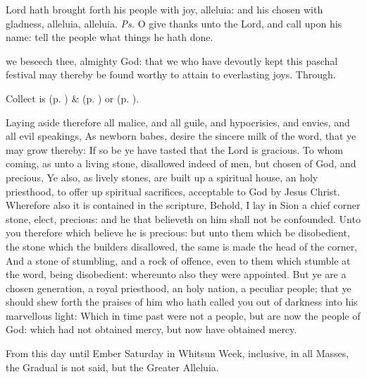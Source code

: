 
\introit
{} Lord hath brought forth his people with joy, alleluia: and his chosen with gladness, alleluia, alleluia. \textit{Ps.} O give thanks unto the Lord, and call upon his name: tell the people what things he hath done.

\collect
{} we beseech thee, almighty God: that we who have devoutly kept this paschal festival may thereby be found worthy to attain to everlasting joys. Through.
\begin{rubric}
     Collect is  (p. \pageref{EasterCollect}) \&   (p. \pageref{SPAgainst}) or  (p. \pageref{SPChiefBishop}).
\end{rubric}

 Laying aside therefore all malice, and all guile, and hypocrisies, and envies, and all evil speakings, As newborn babes, desire the sincere milk of the word, that ye may grow thereby: If so be ye have tasted that the Lord is gracious. To whom coming, as unto a living stone, disallowed indeed of men, but chosen of God, and precious, Ye also, as lively stones, are built up a spiritual house, an holy priesthood, to offer up spiritual sacrifices, acceptable to God by Jesus Christ. Wherefore also it is contained in the scripture, Behold, I lay in Sion a chief corner stone, elect, precious: and he that believeth on him shall not be confounded. Unto you therefore which believe he is precious: but unto them which be disobedient, the stone which the builders disallowed, the same is made the head of the corner, And a stone of stumbling, and a rock of offence, even to them which stumble at the word, being disobedient: whereunto also they were appointed. But ye are a chosen generation, a royal priesthood, an holy nation, a peculiar people; that ye should shew forth the praises of him who hath called you out of darkness into his marvellous light: Which in time past were not a people, but are now the people of God: which had not obtained mercy, but now have obtained mercy.

\begin{rubric}
	From this day until Ember Saturday in Whitsun Week, inclusive, in all Masses, the Gradual is not said, but the Greater Alleluia. 
\end{rubric}


